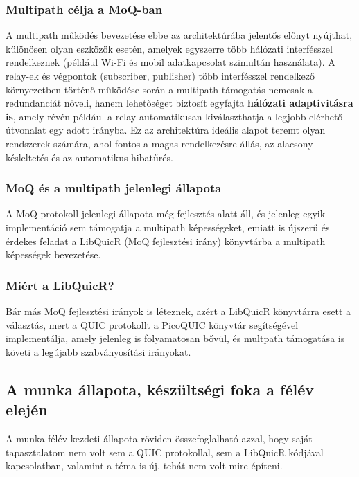 \documentclass[a4paper,oneside]{article}
\begin{document}
\subsubsection{Multipath célja a MoQ-ban}

A multipath működés bevezetése ebbe az architektúrába jelentős előnyt nyújthat, 
különösen olyan eszközök esetén, amelyek egyszerre több hálózati interfésszel 
rendelkeznek (például Wi-Fi és mobil adatkapcsolat szimultán használata). A relay-ek és végpontok 
(subscriber, publisher) több interfésszel rendelkező környezetben 
történő működése során a multipath támogatás nemcsak a redundanciát növeli, hanem 
lehetőséget biztosít egyfajta \textbf{hálózati adaptivitásra is}, amely révén például 
a relay automatikusan kiválaszthatja a legjobb elérhető útvonalat egy adott irányba. 
Ez az architektúra ideális alapot teremt olyan rendszerek számára, ahol fontos a magas 
rendelkezésre állás, az alacsony késleltetés és az automatikus hibatűrés.

\subsubsection{MoQ és a multipath jelenlegi állapota}

A MoQ protokoll jelenlegi állapota még fejlesztés alatt áll, és jelenleg egyik implementáció
sem támogatja a multipath képességeket, emiatt is újszerű és érdekes feladat
a LibQuicR \cite{libquicr}(MoQ fejlesztési irány) könyvtárba a multipath képességek bevezetése.

\subsubsection{Miért a LibQuicR?}

Bár más MoQ fejlesztési irányok is léteznek, azért a LibQuicR könyvtárra esett a
választás, mert a QUIC protokollt a PicoQUIC könyvtár segítségével implementálja, amely
jelenleg is folyamatosan bővül, és multpath támogatása is követi a legújabb szabványosítási irányokat.

\subsection{A munka állapota, készültségi foka a félév elején}
\label{sec:munka-allap-kesz}

A munka félév kezdeti állapota röviden összefoglalható azzal, 
hogy saját tapasztalatom nem volt sem a QUIC protokollal, sem a LibQuicR
kódjával kapcsolatban, valamint a téma is új, tehát nem volt mire építeni.
\end{document}
